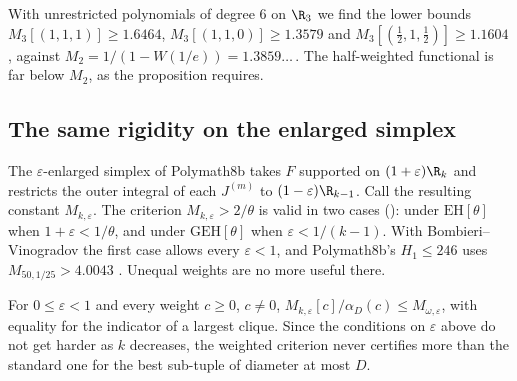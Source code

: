 \begin{remark}[\lbl{Computed}, consistency check for $k=3$]
With unrestricted polynomials of degree $6$ on $\R_3$ we find the lower bounds
$M_3[(1,1,1)]\ge1.6464$, $M_3[(1,1,0)]\ge1.3579$ and
$M_3[(\tfrac12,1,\tfrac12)]\ge1.1604$, against
$M_2=1/(1-W(1/e))=1.3859\ldots$\,. The half-weighted functional is far below
$M_2$, as the proposition requires.
\end{remark}

\subsection*{The same rigidity on the enlarged simplex}
The $\varepsilon$-enlarged simplex of Polymath8b \cite[Thm.~3.12]{Pol14b}
takes $F$
supported on $(1+\varepsilon)\R_k$ and restricts the outer integral of each
$J^{(m)}$ to $(1-\varepsilon)\R_{k-1}$. Call the resulting constant
$M_{k,\varepsilon}$. The criterion $M_{k,\varepsilon}>2/\theta$ is valid in
two cases (): under $\mathrm{EH}[\theta]$ when
$1+\varepsilon<1/\theta$, and under $\mathrm{GEH}[\theta]$ when
$\varepsilon<1/(k-1)$. With Bombieri--Vinogradov the first case allows every
$\varepsilon<1$, and Polymath8b's $H_1\le246$ uses $M_{50,1/25}>4.0043$
\cite[Thm.~3.13]{Pol14b}. Unequal weights are no more useful there.

\begin{proposition}\label{prop:rigid-eps}
For $0\le\varepsilon<1$ and every weight $c\ge0$, $c\ne0$,
$M_{k,\varepsilon}[c]/\alpha_D(c)\le M_{\omega,\varepsilon}$, with equality
for the indicator of a largest clique. Since the conditions on $\varepsilon$
above do not get harder as $k$ decreases, the weighted criterion never
certifies more than the standard one for the best sub-tuple of diameter at
most $D$.
\end{proposition}

